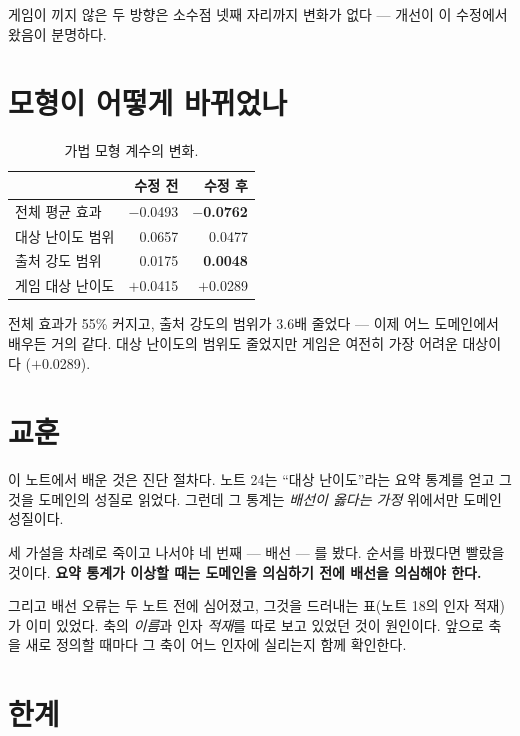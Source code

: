 \documentclass[10pt]{article}
\begin{document}
게임이 끼지 않은 두 방향은 소수점 넷째 자리까지 변화가 없다 --- 개선이 이 수정에서
왔음이 분명하다.


\section{모형이 어떻게 바뀌었나}

\begin{table}[t]
\centering\tsize
\caption{가법 모형 계수의 변화.}
\begin{tabular}{lrr}
\toprule
& 수정 전 & 수정 후 \\
\midrule
전체 평균 효과 & $-$0.0493 & \textbf{$-$0.0762} \\
대상 난이도 범위 & 0.0657 & 0.0477 \\
출처 강도 범위 & 0.0175 & \textbf{0.0048} \\
게임 대상 난이도 & $+$0.0415 & $+$0.0289 \\
\bottomrule
\end{tabular}
\end{table}

전체 효과가 55\% 커지고, 출처 강도의 범위가 3.6배 줄었다 --- 이제 어느 도메인에서
배우든 거의 같다. 대상 난이도의 범위도 줄었지만 게임은 여전히 가장 어려운 대상이다
($+$0.0289).

\section{교훈}

이 노트에서 배운 것은 진단 절차다. 노트 24는 ``대상 난이도''라는 요약 통계를 얻고
그것을 도메인의 성질로 읽었다. 그런데 그 통계는 \emph{배선이 옳다는 가정} 위에서만
도메인 성질이다.

세 가설을 차례로 죽이고 나서야 네 번째 --- 배선 --- 를 봤다. 순서를 바꿨다면
빨랐을 것이다. \textbf{요약 통계가 이상할 때는 도메인을 의심하기 전에 배선을
의심해야 한다.}

그리고 배선 오류는 두 노트 전에 심어졌고, 그것을 드러내는 표(노트 18의 인자 적재)가
이미 있었다. 축의 \emph{이름}과 인자 \emph{적재}를 따로 보고 있었던 것이 원인이다.
앞으로 축을 새로 정의할 때마다 그 축이 어느 인자에 실리는지 함께 확인한다.

\section{한계}
\end{document}
